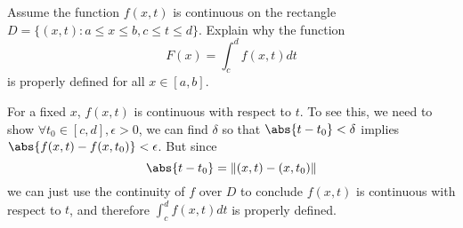\begin{exercise}
\end{exercise}
\begin{solution}
\end{solution}

\begin{exercise}
\end{exercise}
\begin{solution}
\end{solution}

\begin{exercise}
Assume the function \(f(x,t)\) is continuous on the rectangle \(D = \{(x,t):a \leq x \leq b,c \leq t \leq d\}\). Explain why the function
\[F(x) = \int_c^d f(x,t) dt\]
is properly defined for all \(x \in [a,b]\).
\end{exercise}
\begin{solution}
For a fixed \(x\), \(f(x,t)\) is continuous with respect to \(t\). To see this, we need to show \(\forall t_0 \in [c,d],\epsilon > 0\), we can find \(\delta\) so that \(\abs{t - t_0} < \delta \) implies \(\abs{f(x,t) - f(x, t_0)} < \epsilon\). But since
\[\abs{t - t_0} = \|(x,t) - (x, t_0) \|\]
we can just use the continuity of \(f\) over \(D\) to conclude \(f(x,t)\) is continuous with respect to \(t\), and therefore \(\int_c^d f(x,t) dt\) is properly defined.
\end{solution}

